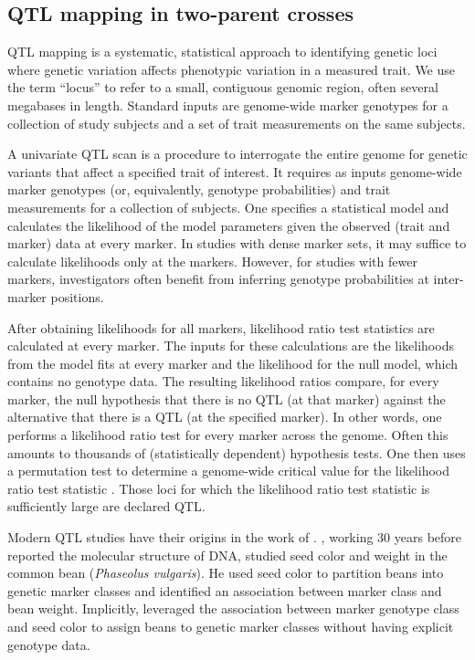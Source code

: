 \documentclass[]{article}\usepackage[]{graphicx}\usepackage[]{color}
\begin{document}
\subsection{QTL mapping in two-parent crosses}

QTL mapping is a systematic, statistical approach to identifying genetic
loci where genetic variation affects phenotypic variation in a measured trait.
We use the term ``locus'' to refer to a small, contiguous genomic region, often
several megabases in length. Standard inputs are genome-wide marker genotypes for a collection of study subjects and a set of trait measurements on the same subjects.

A univariate QTL scan is a procedure to interrogate the entire genome for genetic
variants that affect a specified trait of interest.
It requires as inputs genome-wide marker genotypes (or, equivalently,
genotype probabilities) and trait measurements for a collection of subjects.
One specifies a statistical model and calculates the
likelihood of the model parameters given the observed (trait and marker) data at every marker. In studies with dense marker sets, 
it may suffice to calculate likelihoods only at the markers. However, for
studies with fewer markers, investigators often benefit from inferring 
genotype probabilities at inter-marker positions.


After obtaining likelihoods for all markers, likelihood ratio test statistics are calculated
at every marker. The inputs for these calculations are the likelihoods from the model fits at
every marker and the likelihood for the null model, which contains no genotype data.
The resulting likelihood ratios compare, for every marker, the null hypothesis that there is no 
QTL (at that marker) against the alternative that there is a QTL (at the specified marker).
In other words, one performs a likelihood ratio test for every marker across the genome.
Often this amounts to thousands of (statistically dependent) hypothesis tests.
One then uses a permutation test to determine a genome-wide critical value
for the likelihood ratio test statistic \citep{churchill1994empirical}.
Those loci for which the likelihood ratio test statistic is sufficiently large are declared QTL. 

Modern QTL studies have their origins in the work of \citet{sax1923association}.
\citet{sax1923association}, working 30 years before \citet{watson1953molecular} reported
the molecular structure of DNA, studied seed color and weight in the common bean
(\emph{Phaseolus vulgaris}). He used seed color to partition beans into genetic
marker classes and identified an association between marker class and bean weight. Implicitly, \citet{sax1923association} leveraged the association between marker genotype class and seed color to assign beans to genetic marker classes without having explicit genotype data.
\end{document}
